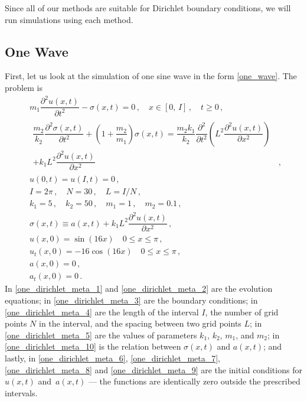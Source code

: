 \documentclass[11pt,a4paper,oneside,openright]{report} %
\begin{document}
Since all of our methods are suitable for Dirichlet boundary conditions, we will run simulations using each method.



\subsection{One Wave}
\noindent
First, let us look at the simulation of one sine wave in the form \eqref{one_wave}. The problem is
\begin{subequations}\label{}
    \begin{align}
        & m_1 \dfrac{\partial^2 u(x,t)}{\partial t^2} - \sigma(x,t)  = 0 \, , \quad x \in \left[0, \, I \right] \, , \quad t \geq 0 \, , \label{one_dirichlet_meta_1} \\[5pt]
        & \begin{aligned}
            \dfrac{m_2}{k_2} \dfrac{\partial^2 \sigma(x,t)}{\partial t^2}  + \left(1 + \dfrac{m_2}{m_1} \right) \sigma(x,t) = \dfrac{m_2 k_1}{k_2} \dfrac{\partial^2 }{\partial t^2 } \left(L^2 \dfrac{\partial^2 u(x,t)}{\partial x^2} \right) & \\ + k_1 L^2 \dfrac{\partial^2 u(x,t)}{\partial x^2} & \, ,
        \end{aligned} \label{one_dirichlet_meta_2} \\[5pt]
        & u(0, t) = u(I, t) = 0 \, , \label{one_dirichlet_meta_3} \\[5pt]
        & I = 2\pi \, , \quad N = 30 \, , \quad L = I/N \, , \label{one_dirichlet_meta_4} \\[5pt]
        & k_1 = 5 \, , \quad k_2 = 50 \, , \quad m_1 = 1 \, , \quad m_2 = 0.1 \, , \label{one_dirichlet_meta_5} \\[5pt]
        & \sigma(x,t) \equiv a(x,t) + k_1 L^2 \dfrac{\partial^2 u(x,t)}{\partial x^2} \, , \label{one_dirichlet_meta_10} \\[5pt]
        & u(x,0) = \sin{(16 x)} \quad 0 \leq x \leq \pi \, , \label{one_dirichlet_meta_6} \\[5pt]
        & u_t(x,0) = - 16 \cos(16 x)  \quad 0 \leq x \leq \pi \, , \label{one_dirichlet_meta_7} \\[5pt]
        & a(x,0) = 0 \, , \label{one_dirichlet_meta_8} \\[5pt]
        & a_t(x,0) = 0 \, . \label{one_dirichlet_meta_9}
    \end{align}
\end{subequations}
In \eqref{one_dirichlet_meta_1} and \eqref{one_dirichlet_meta_2} are the evolution equations; in \eqref{one_dirichlet_meta_3} are the boundary conditions; in \eqref{one_dirichlet_meta_4} are the length of the interval $I$, the number of grid points $N$ in the interval, and the spacing between two grid points $L$; in \eqref{one_dirichlet_meta_5} are the values of parameters $k_1$, $k_2$, $m_1$, and $m_2$; in \eqref{one_dirichlet_meta_10} is the relation between $\sigma(x,t)$ and $a(x,t)$; and lastly, in \eqref{one_dirichlet_meta_6}, \eqref{one_dirichlet_meta_7}, \eqref{one_dirichlet_meta_8} and \eqref{one_dirichlet_meta_9} are the initial conditions for $u(x,t)$ and~$a(x,t)$ — the functions are identically zero outside the prescribed intervals.
\end{document}
